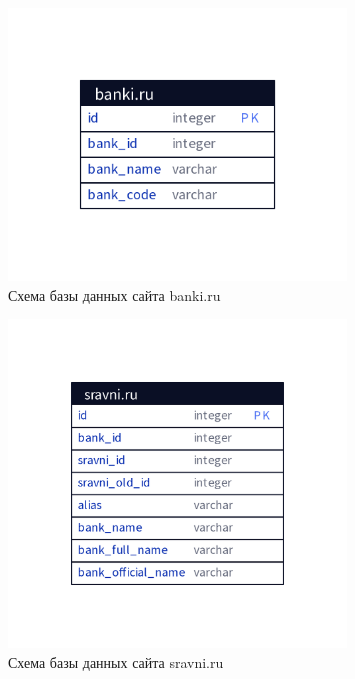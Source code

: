 \documentclass{article}
\begin{document}
\begin{figure}[h!]
\centering
\includegraphics[width=0.8\textwidth]{img/d2/banki_ru.png}
\caption{\label{fig:database_banki_ru}Схема базы данных сайта banki.ru}
\end{figure}

\begin{figure}[h!]
\centering
\includegraphics[width=0.8\textwidth]{img/d2/sravni_ru.png}
\caption{\label{fig:database_sravni_ru}Схема базы данных сайта sravni.ru}
\end{figure}
\end{document}
